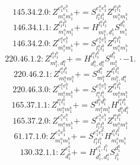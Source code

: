 \documentclass[letterpaper,10pt,fleqn,leqno,onecolumn]{article}
\begin{document}
\begin{equation} \;\;\;\;\;\;  145.34.2.0: Z^{e_{1}^{a}e_{1}^{b}}_{m_{1}^{a}m_{1}^{b}}+=S^{e_{1}^{a}e_{1}^{b}}_{l_{1}^{a}l_{1}^{b}}Z^{l_{1}^{a}l_{1}^{b}}_{m_{1}^{a}m_{1}^{b}} \end{equation}
\begin{equation} \;\;\;\;\;\;  146.34.1.1: Z^{l_{1}^{a}l_{1}^{b}}_{m_{1}^{a}m_{1}^{b}}+=H^{l_{1}^{a}l_{1}^{b}}_{m_{1}^{a},d_{1}^{b}}S^{d_{1}^{b}}_{m_{1}^{b}} \end{equation}
\begin{equation} \;\;\;\;\;\;  146.34.2.0: Z^{e_{1}^{a}e_{1}^{b}}_{m_{1}^{a}m_{1}^{b}}+=S^{e_{1}^{a}e_{1}^{b}}_{l_{1}^{a}l_{1}^{b}}Z^{l_{1}^{a}l_{1}^{b}}_{m_{1}^{a}m_{1}^{b}} \end{equation}
\begin{equation} \;\;\;\;\;\;  220.46.1.2: Z^{l_{1}^{a}l_{1}^{b}}_{m_{1}^{b},d_{1}^{a}}+=H^{l_{1}^{a}l_{1}^{b}}_{d_{1}^{b},d_{1}^{a}}S^{d_{1}^{b}}_{m_{1}^{b}}\cdot -1. \end{equation}
\begin{equation} \;\;\;\;\;\;  220.46.2.1: Z^{l_{1}^{a}l_{1}^{b}}_{m_{1}^{a}m_{1}^{b}}+=S^{d_{1}^{a}}_{m_{1}^{a}}Z^{l_{1}^{a}l_{1}^{b}}_{m_{1}^{b},d_{1}^{a}} \end{equation}
\begin{equation} \;\;\;\;\;\;  220.46.3.0: Z^{e_{1}^{a}e_{1}^{b}}_{m_{1}^{a}m_{1}^{b}}+=S^{e_{1}^{a}e_{1}^{b}}_{l_{1}^{a}l_{1}^{b}}Z^{l_{1}^{a}l_{1}^{b}}_{m_{1}^{a}m_{1}^{b}} \end{equation}
\begin{equation} \;\;\;\;\;\;  165.37.1.1: Z^{l_{1}^{a}l_{1}^{b}}_{m_{1}^{a}m_{1}^{b}}+=S^{d_{1}^{a}d_{1}^{b}}_{m_{1}^{a}m_{1}^{b}}H^{l_{1}^{a}l_{1}^{b}}_{d_{1}^{a}d_{1}^{b}} \end{equation}
\begin{equation} \;\;\;\;\;\;  165.37.2.0: Z^{e_{1}^{a}e_{1}^{b}}_{m_{1}^{a}m_{1}^{b}}+=S^{e_{1}^{a}e_{1}^{b}}_{l_{1}^{a}l_{1}^{b}}Z^{l_{1}^{a}l_{1}^{b}}_{m_{1}^{a}m_{1}^{b}} \end{equation}
\begin{equation} \;\;\;\;\;\;  61.17.1.0: Z^{e_{1}^{a}e_{1}^{b}}_{m_{1}^{a}m_{1}^{b}}+=S^{e_{1}^{a}e_{1}^{b}}_{l_{1}^{a}l_{1}^{b}}H^{l_{1}^{a}l_{1}^{b}}_{m_{1}^{a}m_{1}^{b}} \end{equation}
\begin{equation} \;\;\;\;\;\;  130.32.1.1: Z^{e_{1}^{a}}_{d_{1}^{a}}+=H^{e_{1}^{a},l_{1}^{b}}_{d_{1}^{b},d_{1}^{a}}S^{d_{1}^{b}}_{l_{1}^{b}} \end{equation}
\end{document}
